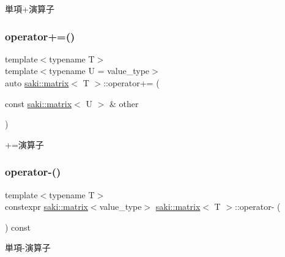 単項+演算子 

\mbox{\label{classsaki_1_1matrix_ad004cb2830b0c22778b99b57fcbde8df}} 
\subsubsection{\texorpdfstring{operator+=()}{operator+=()}}
{\footnotesize\ttfamily template$<$typename T$>$ \\
template$<$typename U  = value\+\_\+type$>$ \\
auto \mbox{\hyperlink{classsaki_1_1matrix}{saki\+::matrix}}$<$ T $>$\+::operator+= (\begin{DoxyParamCaption}\item[{const \mbox{\hyperlink{classsaki_1_1matrix}{saki\+::matrix}}$<$ U $>$ \&}]{other }\end{DoxyParamCaption})\hspace{0.3cm}{\ttfamily [inline]}}



+=演算子 

\mbox{\label{classsaki_1_1matrix_a11aa55aa5c0efdc11c93c6a80188ac62}} 
\subsubsection{\texorpdfstring{operator-\/()}{operator-()}}
{\footnotesize\ttfamily template$<$typename T$>$ \\
constexpr \mbox{\hyperlink{classsaki_1_1matrix}{saki\+::matrix}}$<$value\+\_\+type$>$ \mbox{\hyperlink{classsaki_1_1matrix}{saki\+::matrix}}$<$ T $>$\+::operator-\/ (\begin{DoxyParamCaption}{ }\end{DoxyParamCaption}) const\hspace{0.3cm}{\ttfamily [inline]}}



単項-\/演算子 

\mbox{\label{classsaki_1_1matrix_ae7c736de15ce97ad5d41193beeecf18d}} 
